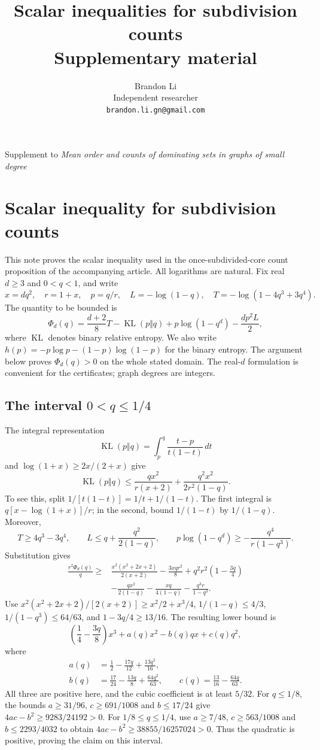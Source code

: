 \documentclass[11pt]{article}
\title{Scalar inequalities for subdivision counts\\\large Supplementary material}
\author{Brandon Li\\\small Independent researcher\\\small\texttt{brandon.li.gn@gmail.com}}
\date{}
\begin{document}
\raggedbottom\maketitle
\begin{center}\small
Supplement to \emph{Mean order and counts of dominating sets in graphs of small degree}
\end{center}
\section{Scalar inequality for subdivision counts}\label{sec:scalarsupp}
This note proves the scalar inequality used in the once-subdivided-core
count proposition of the accompanying article. All logarithms are natural. Fix real $d\ge3$ and
$0<q<1$, and write
\[
 x=dq^2,\quad r=1+x,\quad p=q/r,\quad L=-\log(1-q),\quad
 T=-\log(1-4q^3+3q^4).
\]
The quantity to be bounded is
\[
 \Phi_d(q)=\frac{d+2}{8}T-\operatorname{KL}(p\Vert q)
                  +p\log(1-q^d)-\frac{dp^2L}{2},
\]
where $\operatorname{KL}$ denotes binary relative entropy. We also write
$h(p)=-p\log p-(1-p)\log(1-p)$ for the binary entropy. The argument
below proves $\Phi_d(q)>0$ on the whole stated domain. The real-$d$
formulation is convenient for the certificates; graph degrees are integers.

\subsection{The interval \texorpdfstring{$0<q\le1/4$}{0 < q <= 1/4}}
The integral representation
\[
 \operatorname{KL}(p\Vert q)=\int_p^q\frac{t-p}{t(1-t)}\,dt
\]
and $\log(1+x)\ge2x/(2+x)$ give
\[
 \operatorname{KL}(p\Vert q)
 \le\frac{qx^2}{r(x+2)}+\frac{q^2x^2}{2r^2(1-q)}.
\]
To see this, split $1/[t(1-t)]=1/t+1/(1-t)$. The first integral is
$q[x-\log(1+x)]/r$; in the second, bound $1/(1-t)$ by $1/(1-q)$.
Moreover,
\[
 T\ge4q^3-3q^4,\qquad
 L\le q+\frac{q^2}{2(1-q)},\qquad
 p\log(1-q^d)\ge-\frac{q^4}{r(1-q^3)}.
\]
Substitution gives
\begin{align*}
 \frac{r^2\Phi_d(q)}q\ge{}&
 \frac{x^2(x^2+2x+2)}{2(x+2)}-\frac{3xqr^2}{8}
 +q^2r^2\left(1-\frac{3q}{4}\right)\\
 &-\frac{qx^2}{2(1-q)}-\frac{xq}{4(1-q)}
 -\frac{q^3r}{1-q^3}.
\end{align*}
Use $x^2(x^2+2x+2)/[2(x+2)]\ge x^2/2+x^3/4$,
$1/(1-q)\le4/3$, $1/(1-q^3)\le64/63$, and
$1-3q/4\ge13/16$. The resulting lower bound is
\[
 \left(\frac14-\frac{3q}{8}\right)x^3
       +a(q)x^2-b(q)qx+c(q)q^2,
\]
where
\begin{align*}
 a(q)&=\frac12-\frac{17q}{12}+\frac{13q^2}{16},\\
 b(q)&=\frac{17}{24}-\frac{13q}{8}+\frac{64q^2}{63},\qquad
 c(q)=\frac{13}{16}-\frac{64q}{63}.
\end{align*}
All three are positive here, and the cubic coefficient is at least $5/32$.
For $q\le1/8$, the bounds $a\ge31/96$, $c\ge691/1008$ and
$b\le17/24$ give $4ac-b^2\ge9283/24192>0$.
For $1/8\le q\le1/4$, use $a\ge7/48$, $c\ge563/1008$ and
$b\le2293/4032$ to obtain
$4ac-b^2\ge38855/16257024>0$.
Thus the quadratic is positive, proving the claim on this interval.
\end{document}
